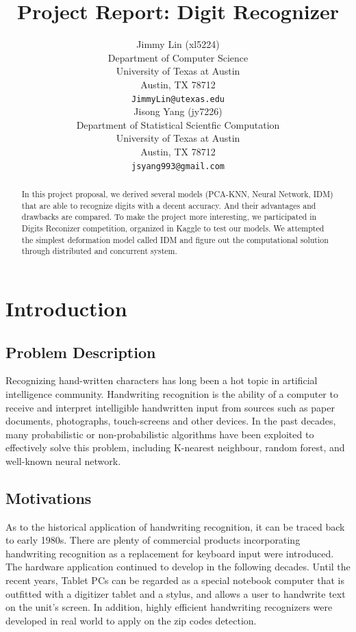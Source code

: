 \documentclass{article} %
\title{Project Report: Digit Recognizer}
\author{
Jimmy Lin (xl5224) \\
Department of Computer Science\\
University of Texas at Austin\\
Austin, TX 78712 \\
\texttt{JimmyLin@utexas.edu} \\
\And
Jisong Yang (jy7226) \\
Department of Statistical Scientfic Computation\\
University of Texas at Austin\\
Austin, TX 78712 \\
\texttt{jsyang993@gmail.com} \\
}
\begin{document}
\maketitle

\begin{abstract}
    In this project proposal, we derived several models (PCA-KNN, Neural
    Network, IDM) that are able to recognize digits with a decent accuracy.
    And their advantages and drawbacks are compared. To make the project more
    interesting, we participated in Digits Reconizer competition, organized in
    Kaggle to test our models. We attempted the simplest deformation model
    called IDM and figure out the computational solution through distributed
    and concurrent system. 
\end{abstract}

\section{Introduction}
\subsection{Problem Description}
Recognizing hand-written characters has long been a hot topic in artificial
intelligence community. 
Handwriting recognition is the ability of a computer to receive and
interpret intelligible handwritten input from sources such as paper documents,
photographs, touch-screens and other devices.
In the past decades, many probabilistic or non-probabilistic algorithms have
been exploited to effectively solve this problem, including K-nearest
neighbour, random forest, and well-known neural network. 


 \subsection{Motivations} \label{Motivation}
As to the historical application of handwriting recognition, 
it can be traced back to early 1980s.  There are plenty of commercial products
incorporating handwriting recognition as a replacement for keyboard input were
introduced. The hardware application continued to develop
in the following decades.  Until the recent years, Tablet PCs can be regarded
as a special notebook computer that is outfitted with a digitizer tablet and a
stylus, and allows a user to handwrite text on the unit's screen. In addition,
highly efficient handwriting recognizers were developed in real world to apply
on the zip codes detection.
\end{document}
